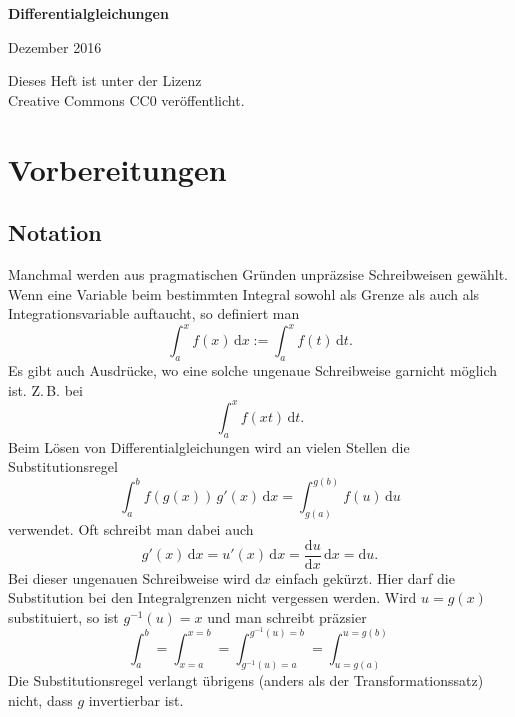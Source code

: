 \documentclass[a4paper,10pt,fleqn,twocolumn,twoside,openany]{article}
\numberwithin{equation}{section}
\theoremstyle{definition}
\begin{document}
\setlength{\abovedisplayskip}{6pt}
\setlength{\belowdisplayskip}{6pt}
\setlength{\abovedisplayshortskip}{6pt}
\setlength{\belowdisplayshortskip}{6pt}

\begin{titlepage}
\centering
\phantom{x}

\vspace{20em}
{\noindent\Huge\sffamily\textbf{Differentialgleichungen}}

\vspace{2em}
{\Large Dezember 2016}\\
\end{titlepage}

\thispagestyle{empty}

\noindent
Dieses Heft ist unter der Lizenz\\
Creative Commons CC0 veröffentlicht.

\renewcommand{\contentsname}{
\normalfont\sffamily\bfseries\LARGE
Inhaltsverzeichnis}
\tableofcontents

\section{Vorbereitungen}
\subsection{Notation}
Manchmal werden aus pragmatischen Gründen unpräzsise Schreibweisen
gewählt. Wenn eine Variable beim bestimmten Integral sowohl als Grenze
als auch als Integrationsvariable auftaucht, so definiert man
\begin{equation}
\int_a^x f(x)\,\mathrm dx := \int_a^x f(t)\,\mathrm dt.
\end{equation}
Es gibt auch Ausdrücke, wo eine solche ungenaue Schreibweise garnicht
möglich ist. Z.\,B. bei
\begin{equation}
\int_a^x f(xt)\,\mathrm dt.
\end{equation}
Beim Lösen von Differentialgleichungen
wird an vielen Stellen die Substitutionsregel
\begin{equation}
\int_a^b f(g(x))\,g'(x)\,\mathrm dx
= \int_{g(a)}^{g(b)} f(u)\,\mathrm du
\end{equation}
verwendet. Oft schreibt man dabei auch
\begin{equation}
g'(x)\,\mathrm dx = u'(x)\,\mathrm dx
= \frac{\mathrm du}{\mathrm dx}\,\mathrm dx
= \mathrm du.
\end{equation}
Bei dieser ungenauen Schreibweise wird $\mathrm dx$ einfach
{\glqq}gekürzt{\grqq}. Hier darf die Substitution bei den
Integralgrenzen nicht vergessen werden. Wird $u=g(x)$ substituiert,
so ist $g^{-1}(u)=x$ und man schreibt präzsier
\begin{equation}
\int_a^b = \int_{x=a}^{x=b} = \int_{g^{-1}(u)=a}^{g^{-1}(u)=b}
= \int_{u=g(a)}^{u=g(b)}
\end{equation}
Die Substitutionsregel verlangt übrigens (anders als der
Transformationssatz) nicht, dass $g$ invertierbar ist.
\end{document}
